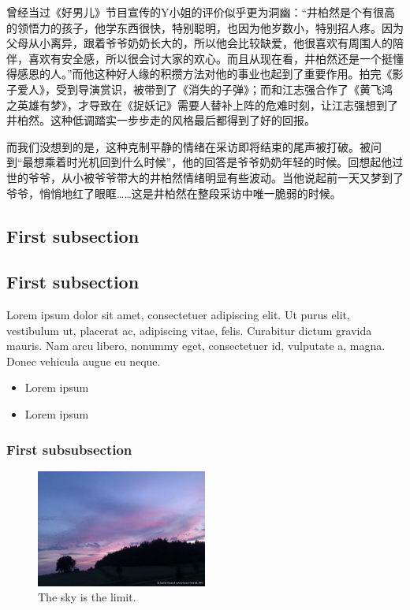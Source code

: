 \documentclass[12pt]{ctexart}
\begin{document}
曾经当过《好男儿》节目宣传的Y小姐的评价似乎更为洞幽：“井柏然是个有很高的领悟力的孩子，他学东西很快，特别聪明，也因为他岁数小，特别招人疼。因为父母从小离异，跟着爷爷奶奶长大的，所以他会比较缺爱，他很喜欢有周围人的陪伴，喜欢有安全感，所以很会讨大家的欢心。而且从现在看，井柏然还是一个挺懂得感恩的人。”而他这种好人缘的积攒方法对他的事业也起到了重要作用。拍完《影子爱人》，受到导演赏识，被带到了《消失的子弹》；而和江志强合作了《黄飞鸿 之英雄有梦》，才导致在《捉妖记》需要人替补上阵的危难时刻，让江志强想到了井柏然。这种低调踏实一步步走的风格最后都得到了好的回报。



而我们没想到的是，这种克制平静的情绪在采访即将结束的尾声被打破。被问到“最想乘着时光机回到什么时候”，他的回答是爷爷奶奶年轻的时候。回想起他过世的爷爷，从小被爷爷带大的井柏然情绪明显有些波动。当他说起前一天又梦到了爷爷，悄悄地红了眼眶……这是井柏然在整段采访中唯一脆弱的时候。

\subsection{First subsection}
\subsection{First subsection}
\lipsum[1]

\leftboxbegin
Lorem ipsum dolor sit amet, consectetuer adipiscing elit. Ut purus elit, vestibulum ut, placerat ac, adipiscing vitae, felis. Curabitur dictum gravida mauris. Nam arcu libero, nonummy eget, consectetuer id, vulputate a, magna. Donec vehicula augue eu neque. 
\leftboxend

\lipsum[1-2]

\rightboxbegin
\begin{itemize}
 \item Lorem ipsum
 \item Lorem ipsum
\end{itemize}
\rightboxend

\lipsum[1]

\subsubsection{First subsubsection}

\lipsum[1]

\begin{figure}[!h]
\centering
\includegraphics[width=0.5\textwidth]{sky.jpg}
\caption{The sky is the limit.}
\end{figure}
\end{document}
